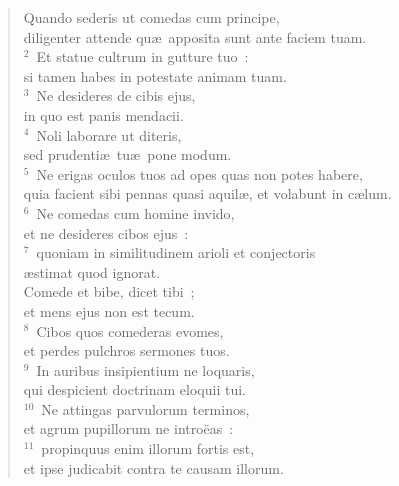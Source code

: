 \begin{flushleft}\begin{verse}\vspace{-19pt}\hspace{6pt}Quando sederis ut comedas cum principe,\\\hspace{6pt} diligenter attende qu\ae\ apposita sunt ante faciem tuam.\\
${}^{2}$~Et statue cultrum in gutture tuo~:\\ si tamen habes in potestate animam tuam.\\
${}^{3}$~Ne desideres de cibis ejus,\\ in quo est panis mendacii.\\
${}^{4}$~Noli laborare ut diteris,\\ sed prudenti\ae\ tu\ae\ pone modum.\\
${}^{5}$~Ne erigas oculos tuos ad opes quas non potes habere,\\ quia facient sibi pennas quasi aquil\ae , et volabunt in c\ae lum.\\
${}^{6}$~Ne comedas cum homine invido,\\ et ne desideres cibos ejus~:\\
${}^{7}$~quoniam in similitudinem arioli et conjectoris\\ \ae stimat quod ignorat.\\ Comede et bibe, dicet tibi~;\\ et mens ejus non est tecum.\\
${}^{8}$~Cibos quos comederas evomes,\\ et perdes pulchros sermones tuos.\\
${}^{9}$~In auribus insipientium ne loquaris,\\ qui despicient doctrinam eloquii tui.\\
${}^{10}$~Ne attingas parvulorum terminos,\\ et agrum pupillorum ne intro\"eas~:\\
${}^{11}$~propinquus enim illorum fortis est,\\ et ipse judicabit contra te causam illorum.\end{verse}\end{flushleft}



